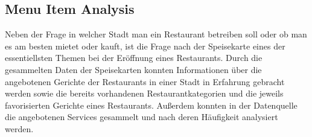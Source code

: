\subsection{Menu Item Analysis}
\label{subsec:menu}
Neben der Frage in welcher Stadt man ein Restaurant betreiben soll oder ob man es am besten mietet oder kauft,
ist die Frage nach der Speisekarte eines der essentiellsten Themen bei der Eröffnung eines Restaurants.
\newline
Durch die gesammelten Daten der Speisekarten konnten Informationen über die angebotenen Gerichte der Restaurants in einer
Stadt in Erfahrung gebracht werden sowie die bereits vorhandenen Restaurantkategorien und die jeweils favorisierten
Gerichte eines Restaurants.
Außerdem konnten in der Datenquelle die angebotenen Services gesammelt und nach deren Häufigkeit analysiert werden.
\newline
% 
% 
